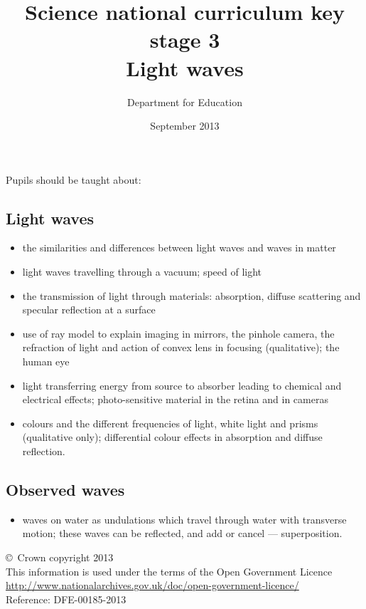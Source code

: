 \documentclass[a4paper,12pt]{article}
\begin{document}
\setcounter{secnumdepth}{0}

\title{Science national curriculum key stage 3\\Light waves}
\author{Department for Education}
\date{September 2013}
\maketitle

\thispagestyle{empty}

Pupils should be taught about:

\subsection{Light waves}
\begin{itemize}
\item the similarities and differences between light waves and waves in matter
\item light waves travelling through a vacuum; speed of light
\item the transmission of light through materials: absorption, diffuse scattering and specular
reflection at a surface
\item use of ray model to explain imaging in mirrors, the pinhole camera, the refraction of
light and action of convex lens in focusing (qualitative); the human eye
\item light transferring energy from source to absorber leading to chemical and electrical
effects; photo-sensitive material in the retina and in cameras
\item colours and the different frequencies of light, white light and prisms (qualitative only);
differential colour effects in absorption and diffuse reflection.
\end{itemize}
\subsection{Observed waves}
\begin{itemize}
\item waves on water as undulations which travel through water with transverse motion;
these waves can be reflected, and add or cancel --- superposition.
\end{itemize}

\vfill

\footnotesize
\noindent \copyright\ Crown copyright 2013\\
This information is used under the terms of the Open Government Licence\\
\url{http://www.nationalarchives.gov.uk/doc/open-government-licence/}\\
{\tiny Reference: DFE-00185-2013}
\end{document}
